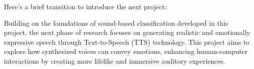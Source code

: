 Here’s a brief transition to introduce the next project:

Building on the foundations of sound-based classification developed in this project, the next phase of research focuses on generating realistic and emotionally expressive speech through Text-to-Speech (TTS) technology. This project aims to explore how synthesized voices can convey emotions, enhancing human-computer interactions by creating more lifelike and immersive auditory experiences.

